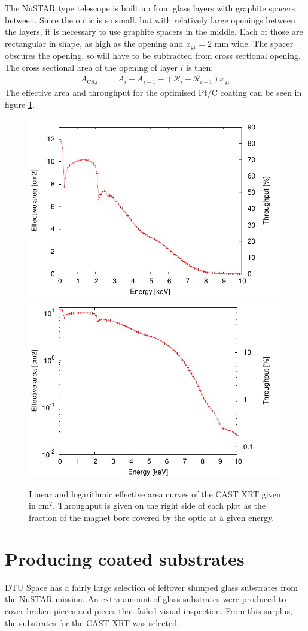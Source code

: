 The NuSTAR type telescope is built up from glass layers with graphite spacers between.  Since the optic is so small, but with relatively large openings between the layers, it is necessary to use graphite spacers in the middle. Each of those are rectangular in shape, as high as the opening and $x_{\text{gr}}=2$ mm wide. The spacer obscures the opening, so will have to be subtracted from cross sectional opening. The cross sectional area of the  opening of layer $i$ is then:
\begin{eqnarray}
  A_{\text{CS,i}} &=& A_{i} - A_{i-1} - (\mathcal{R}_{i}-\mathcal{R}_{i-1})x_{\text{gr}}
\end{eqnarray}
The effective area and throughput for the optimised Pt/C coating can be seen in figure \ref{fig:pt-c_effarea_throughput}.

\begin{figure}[htbp]
  \centering
  \includegraphics[width=0.47\linewidth]{figures/cast/pt-c_effara_throughput_lin.pdf}
  \includegraphics[width=0.47\linewidth]{figures/cast/pt-c_effara_throughput_log.pdf}
  \caption{\footnotesize Linear and logarithmic effective area curves of the CAST XRT given in cm$^2$. Throughput is given on the right side of each plot as the fraction of the magnet bore covered by the optic at a given energy.}
  \label{fig:pt-c_effarea_throughput}
\end{figure}

\section{Producing coated substrates}
DTU Space has a fairly large selection of leftover slumped glass substrates from the NuSTAR mission. An extra amount of glass substrates were produced to cover broken pieces and pieces that failed visual inspection. From this surplus, the substrates for the CAST XRT was selected.

